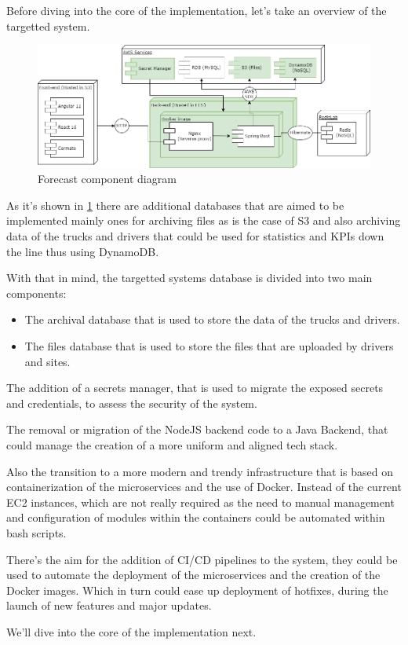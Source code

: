 Before diving into the core of the implementation, let's take an overview of the 
targetted system.

\begin{figure}[!htpb]
    \includegraphics[width=\textwidth]{images/forecast}
    \caption{\footnotesize{Forecast component diagram}}
    \label{fig:forecast}
\end{figure}

As it's shown in \ref{fig:forecast} there are additional databases that are aimed to be
implemented mainly ones for archiving files as is the case of S3 and also archiving data
of the trucks and drivers that could be used for statistics and KPIs down the line thus
using DynamoDB\@.

With that in mind, the targetted systems database is divided into two main components:
    \begin{itemize}
        \item The archival database that is used to store the data of the trucks
            and drivers.
        \item The files database that is used to store the files that are uploaded
            by drivers and sites.
    \end{itemize}

The addition of a secrets manager, that is used to migrate the exposed secrets and
credentials, to assess the security of the system.

The removal or migration of the NodeJS backend code to a Java Backend, that could
manage the creation of a more uniform and aligned tech stack.

Also the transition to a more modern and trendy infrastructure that is based on 
containerization of the microservices and the use of Docker. Instead of the current
EC2 instances, which are not really required as the need to manual management and
configuration of modules within the containers could be automated within 
bash scripts.

There's the aim for the addition of CI/CD pipelines to the system, they could be
used to automate the deployment of the microservices and the creation of the
Docker images. Which in turn could ease up deployment of hotfixes, during the 
launch of new features and major updates.

We'll dive into the core of the implementation next.
